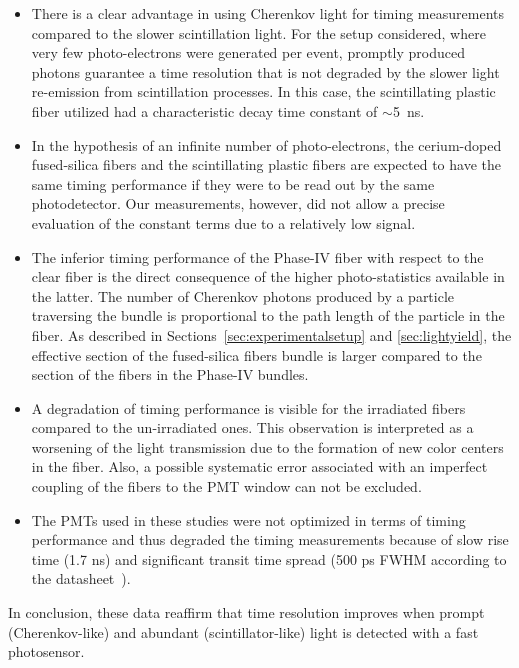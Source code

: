 \documentclass[a4paper,11pt]{article}
\begin{document}
\begin{itemize}
\item There is a clear advantage in using Cherenkov light for timing measurements compared to the slower scintillation light. For the setup considered, where very few photo-electrons were generated per event, promptly produced photons guarantee a time resolution that is not degraded by the slower light re-emission from scintillation processes. In this case, the scintillating plastic fiber utilized had a characteristic decay time constant of $\sim$5~ns.
\item In the hypothesis of an infinite number of photo-electrons, the cerium-doped fused-silica fibers and the scintillating plastic fibers are expected to have the same timing performance if they were to be read out by the same photodetector. Our measurements, however, did not allow a precise evaluation of the constant terms due to a relatively low signal.
\item The inferior timing performance of the Phase-IV fiber with respect to the clear fiber is the direct consequence of the higher photo-statistics available in the latter. The number of Cherenkov photons produced by a particle traversing the bundle is proportional to the path length of the particle in the fiber. As described in Sections~\ref{sec:experimentalsetup} and \ref{sec:lightyield}, the effective section of the fused-silica fibers bundle is larger compared to the section of the fibers in the Phase-IV bundles.
\item A degradation of timing performance is visible for the irradiated fibers compared to the un-irradiated ones. This observation is interpreted as a worsening of the light transmission due to the formation of new color centers in the fiber. Also, a possible systematic error associated with an imperfect coupling of the fibers to the PMT window can not be excluded.
\item The PMTs used in these studies were not optimized in terms of timing performance and thus degraded the timing measurements because of slow rise time (1.7 ns) and significant transit time spread (500 ps FWHM according to the datasheet~\cite{r-PMT}).
\end{itemize}
In conclusion, these data reaffirm that time resolution improves when prompt (Cherenkov-like) and abundant (scintillator-like) light is detected with a fast photosensor.
\end{document}
